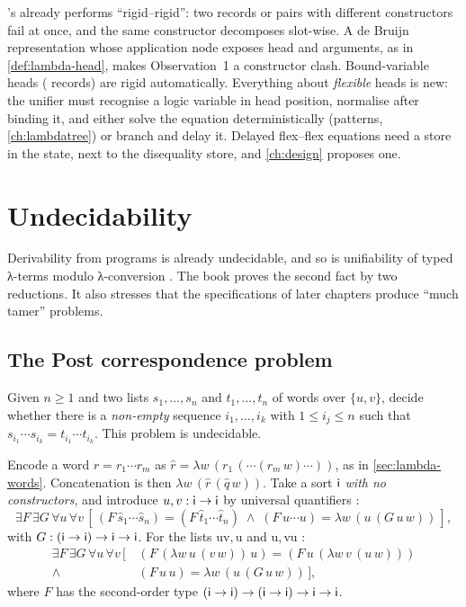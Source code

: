 {\begin{kanren}
\micro's  already performs \enquote{rigid–rigid}: two records or pairs with different
constructors fail at once, and the same constructor decomposes slot-wise. A de Bruijn representation
whose application node exposes head and arguments, as in \cref{def:lambda-head}, makes Observation~1
a constructor clash. Bound-variable heads ( records) are rigid automatically. Everything about
\emph{flexible} heads is new: the unifier must recognise a logic variable in head position, normalise
after binding it, and either solve the equation deterministically (patterns, \cref{ch:lambdatree}) or
branch and delay it. Delayed flex–flex equations need a store in the state, next to the disequality
store, and \cref{ch:design} proposes one.
\end{kanren}

\section{Undecidability}\label{sec:lambda-undecidable}

Derivability from \fohc{} programs is already undecidable, and so is unifiability of typed λ-terms
modulo λ-conversion . The book proves the second fact by two reductions. It also stresses that
the specifications of later chapters produce \enquote{much tamer} problems.

\subsection{The Post correspondence problem}\label{sec:lambda-pcp}

\begin{definition}
Given $n\ge 1$ and two lists $s_1,\dots,s_n$ and $t_1,\dots,t_n$ of words over $\{u,v\}$, decide whether
there is a \emph{non-empty} sequence $i_1,\dots,i_k$ with $1\le i_j\le n$ such that
$s_{i_1}\cdots s_{i_k}=t_{i_1}\cdots t_{i_k}$. This problem is undecidable.
\end{definition}

Encode a word $r=r_1\cdots r_m$ as $\hat r=\lambda w\,(r_1\,(\cdots(r_m\,w)\cdots))$, as in
\cref{sec:lambda-words}. Concatenation is then $\lambda w\,(\hat r\,(\hat q\,w))$. Take a sort $\mathsf{i}$
\emph{with no constructors}, and introduce $u,v:\mathsf{i}\to\mathsf{i}$ by universal quantifiers
:
\[
  \exists F\,\exists G\,\forall u\,\forall v\,
  [\,(F\,\hat s_1\cdots\hat s_n)=(F\,\hat t_1\cdots\hat t_n)\;\wedge\;(F\,u\cdots u)=\lambda w\,(u\,(G\,u\,w))\,],
\]
with $G:(\mathsf{i}\to\mathsf{i})\to\mathsf{i}\to\mathsf{i}$. For the lists $\mathrm{uv},\mathrm{u}$ and
$\mathrm{u},\mathrm{vu}$ :
\[
\begin{aligned}
  \exists F\,\exists G\,\forall u\,\forall v\,
  [\,&(F\,(\lambda w\,u\,(v\,w))\,u)=(F\,u\,(\lambda w\,v\,(u\,w)))\\
  {}\wedge{}&(F\,u\,u)=\lambda w\,(u\,(G\,u\,w))\,],
\end{aligned}
\]
where $F$ has the second-order type $(\mathsf{i}\to\mathsf{i})\to(\mathsf{i}\to\mathsf{i})\to\mathsf{i}\to\mathsf{i}$.

}
